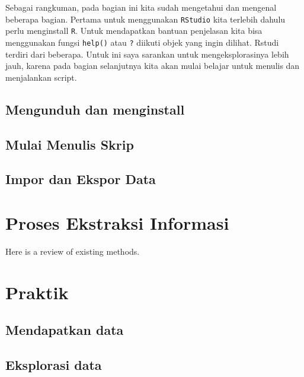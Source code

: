 \documentclass[]{book}
\theoremstyle{definition}
\theoremstyle{definition}
\theoremstyle{definition}
\theoremstyle{remark}
\begin{document}
Sebagai rangkuman, pada bagian ini kita sudah mengetahui dan mengenal
beberapa bagian. Pertama untuk menggunakan \texttt{RStudio} kita
terlebih dahulu perlu menginstall \texttt{R}. Untuk mendapatkan bantuan
penjelasan kita bisa menggunakan fungsi \texttt{help()} atau \texttt{?}
diikuti objek yang ingin dilihat. Rstudi terdiri dari beberapa. Untuk
ini saya sarankan untuk mengeksplorasinya lebih jauh, karena pada bagian
selanjutnya kita akan mulai belajar untuk menulis dan menjalankan
script.

\hypertarget{mengunduh-dan-menginstall}{%
\section{Mengunduh dan menginstall}\label{mengunduh-dan-menginstall}}

\hypertarget{mulai-menulis-skrip}{%
\section{Mulai Menulis Skrip}\label{mulai-menulis-skrip}}

\hypertarget{impor-dan-ekspor-data}{%
\section{Impor dan Ekspor Data}\label{impor-dan-ekspor-data}}

\hypertarget{proses-ekstraksi-informasi}{%
\chapter{Proses Ekstraksi Informasi}\label{proses-ekstraksi-informasi}}

Here is a review of existing methods.

\hypertarget{praktik}{%
\chapter{Praktik}\label{praktik}}

\hypertarget{mendapatkan-data}{%
\section{Mendapatkan data}\label{mendapatkan-data}}

\hypertarget{eksplorasi-data}{%
\section{Eksplorasi data}\label{eksplorasi-data}}
\end{document}
